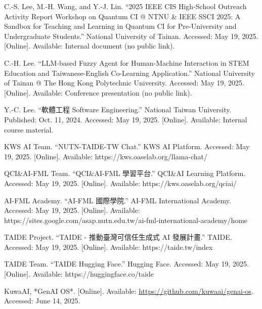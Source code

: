 \documentclass[twocolumn,11pt,a4paper]{article}
\begin{document}
\begin{thebibliography}{9}

C.-S. Lee, M.-H. Wang, and Y.-J. Lin. “2025 IEEE CIS High-School Outreach Activity Report Workshop on Quantum CI @ NTNU \& IEEE SSCI 2025: A Sandbox for Teaching and Learning in Quantum CI for Pre-University and Undergraduate Students.” National University of Tainan. Accessed: May 19, 2025. [Online]. Available: Internal document (no public link).

C.-H. Lee. “LLM-based Fuzzy Agent for Human-Machine Interaction in STEM Education and Taiwanese-English Co-Learning Application.” National University of Tainan @ The Hong Kong Polytechnic University. Accessed: May 19, 2025. [Online]. Available: Conference presentation (no public link).

Y.-C. Lee. “軟體工程 Software Engineering.” National Taiwan University. Published: Oct. 11, 2024. Accessed: May 19, 2025. [Online]. Available: Internal course material.

KWS AI Team. “NUTN-TAIDE-TW Chat.” KWS AI Platform. Accessed: May 19, 2025. [Online]. Available: https://kws.oaselab.org/llama-chat/

QCI\&AI-FML Team. “QCI\&AI-FML 學習平台.” QCI\&AI Learning Platform. Accessed: May 19, 2025. [Online]. Available: https://kws.oaselab.org/qciai/

AI-FML Academy. “AI-FML 國際學院.” AI-FML International Academy. Accessed: May 19, 2025. [Online]. Available: https://sites.google.com/asap.nutn.edu.tw/ai-fml-international-academy/home

TAIDE Project. “TAIDE - 推動臺灣可信任生成式 AI 發展計畫.” TAIDE. Accessed: May 19, 2025. [Online]. Available: https://taide.tw/index

TAIDE Team. “TAIDE Hugging Face.” Hugging Face. Accessed: May 19, 2025. [Online]. Available: https://huggingface.co/taide

KuwaAI, *GenAI OS*. [Online]. Available: \url{https://github.com/kuwaai/genai-os}. Accessed: June 14, 2025.


\end{thebibliography}
\end{document}
